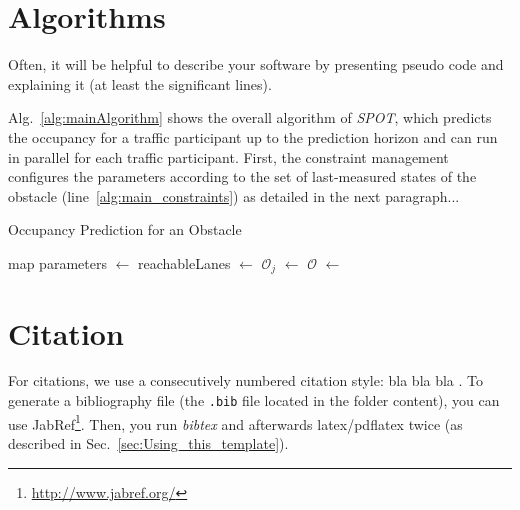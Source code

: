 \section{Algorithms}
Often, it will be helpful to describe your software by presenting pseudo code and explaining it (at least the significant lines). 

Alg.~\ref{alg:mainAlgorithm} shows the overall algorithm of \textit{SPOT}, which predicts the occupancy for a traffic participant up to the prediction horizon and can run in parallel for each traffic participant. First, the constraint management configures the parameters according to the set of last-measured states of the obstacle (line~\ref{alg:main_constraints}) as detailed in the next paragraph...

\begin{algorithm}
	\caption{Occupancy Prediction for an Obstacle}
	\begin{algorithmic}[1]
	\Require map
	\State parameters $\gets$  \label{alg:main_constraints}
	\State reachableLanes $\gets$  \label{alg:main_reach}
		\State $\mathcal{O}_{j}$ $\gets$ \label{alg:main_abstractions}
	\EndFor
	\State \Return $\mathcal{O}$ $\gets$  \label{alg:main_intersect}
	\end{algorithmic}
	\label{alg:mainAlgorithm}
\end{algorithm}


\section{Citation} \label{sec:Citation}
For citations, we use a consecutively numbered citation style: bla \cite{latex} bla \cite{Koschi2017a, Althoff2017a} bla \cite{Paden2016}. To generate a bibliography file (the \texttt{.bib} file located in the folder content), you can use JabRef\footnote{\url{http://www.jabref.org/}}. Then, you run \textit{bibtex} and afterwards latex/pdflatex twice (as described in Sec.~\ref{sec:Using_this_template}).